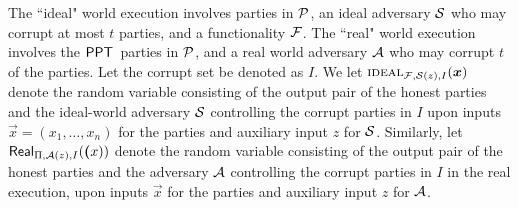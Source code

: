 The ``ideal" world execution involves parties in $\mathcal{P}$, an ideal adversary $\mathcal{S}$ who may corrupt at most $t$  parties, and a  functionality $\mathcal{F}$.  The ``real" world execution involves the $\mathsf{PPT}$\ parties  in $\mathcal{P}$,  and a real world adversary $\mathcal{A}$ who may corrupt  $t$ of the parties.  Let the corrupt set be denoted as $I$. We let $\Ideal_{\Func, \Sim(z),I}(\vec{x})$ denote the random variable consisting of the output pair of the honest parties and the ideal-world adversary $\mathcal{S}$ controlling the corrupt parties in $I$ upon inputs $\vec{x} = (x_1,\ldots,x_n)$ for the parties and auxiliary input $z$ for $\mathcal{S}$. Similarly,  let $\Real_{\Pi, \Adv(z),I}(\vec(x))$ denote the random variable consisting of the output pair of the honest parties and the adversary $\mathcal{A}$ controlling the corrupt parties in $I$ in the real execution, upon inputs $\vec{x}$ for the parties and auxiliary input $z$ for $\mathcal{A}$. 




